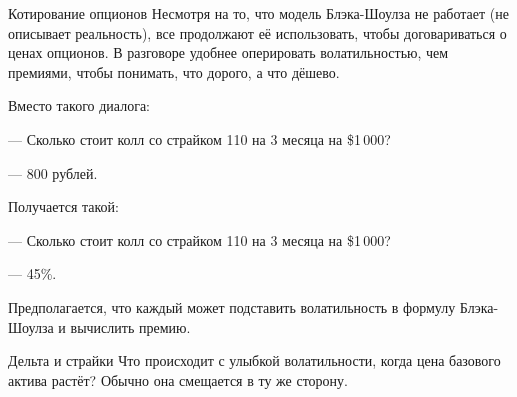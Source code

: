 \documentclass{beamer}
\begin{document}
\begin{frame}{Котирование опционов}
\justify
Несмотря на то, что модель Блэка-Шоулза не работает (не описывает реальность), все продолжают её использовать, чтобы договариваться о ценах опционов. В разговоре удобнее оперировать волатильностью, чем премиями, чтобы понимать, что дорого, а что дёшево.

\justify
Вместо такого диалога:

--- Сколько стоит колл со страйком 110 на 3 месяца на \$1\,000?

--- 800 рублей.

\justify
Получается такой:

--- Сколько стоит колл со страйком 110 на 3 месяца на \$1\,000?

--- 45\%.

\justify
Предполагается, что каждый может подставить волатильность в формулу Блэка-Шоулза и вычислить премию.
\end{frame}



\begin{frame}{Дельта и страйки}
\justify
Что происходит с улыбкой волатильности, когда цена базового актива растёт? Обычно она смещается в ту же сторону.

\centering
{}
\end{frame}
\end{document}
